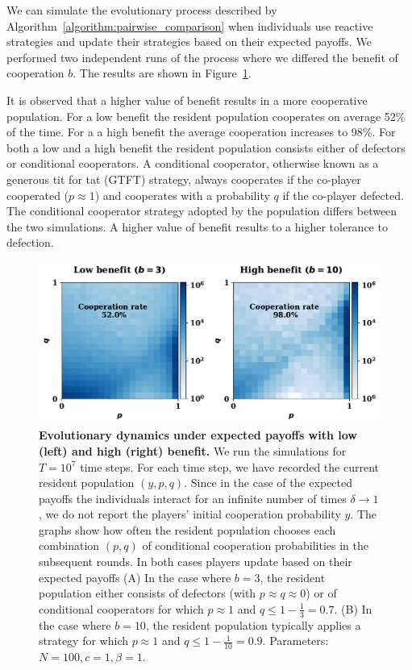 \documentclass[11pt]{article}
\theoremstyle{plainCl1}
\theoremstyle{plainCl2}
\begin{document}
We can simulate the evolutionary process described by
Algorithm~\ref{algorithm:pairwise_comparison} when individuals use reactive
strategies and update their strategies based on their expected payoffs. We
performed two independent runs of the process where we differed the benefit of
cooperation \(b\). The results are shown in
Figure~\ref{fig:expected_payoffs_results}.

It is observed that a higher value of benefit results in a more cooperative
population. For a low benefit the resident population cooperates on average 52\%
of the time. For a a high benefit the average cooperation increases to 98\%. For
both a low and a high benefit the resident population consists either of
defectors or conditional cooperators. A conditional cooperator, otherwise
known as a generous tit for tat (GTFT) strategy, always cooperates if the
co-player cooperated ($p\approx1$) and cooperates with a probability \(q\) if
the co-player defected. The conditional cooperator strategy adopted by the
population differs between the two simulations. A higher value of benefit
results to a higher tolerance to defection.

\begin{figure}[!htbp]
    \centering 
    \includegraphics[width=.70\textwidth]{static/expected_payoffs_donation_game.pdf}
    \caption{\textbf{Evolutionary dynamics under expected payoffs with
    low (left) and high (right) benefit.} We run the simulations for \(T =
    10^7\) time steps. For each time step, we have recorded the current resident
    population \((y, p, q)\). Since in the case of the expected payoffs the
    individuals interact for an infinite number of times \(\delta \rightarrow
    1\), we do not report the players' initial cooperation probability \(y\).
    The graphs show how often the resident population chooses each combination
    \((p, q)\) of conditional cooperation probabilities in the subsequent
    rounds. In both cases players update based on their expected payoffs (A) In
    the case where \(b=3\), the resident population either consists of defectors
    (with \(p \approx q \approx 0\)) or of conditional cooperators for which \(p
    \approx 1\) and \(q \leq 1 - \frac{1}{3}=0.7\). (B) In the case where
    \(b=10\), the resident population typically applies a strategy for which \(p
    \approx 1\) and \(q \leq 1 - \frac{1}{10}=0.9\). Parameters: \(N =100, c=1,
    \beta=1\).
    }\label{fig:expected_payoffs_results}
\end{figure}
\end{document}
